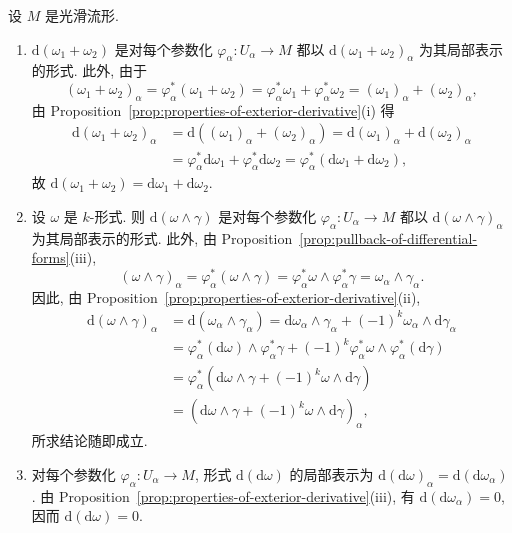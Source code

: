\begin{description}[font=\normalfont,leftmargin=2em,labelwidth=1.5em]
设 $M$ 是光滑流形.
\begin{enumerate}[label=(\roman*),ref=\roman*,leftmargin=*]
\item $\mathrm{d}(\omega_1+\omega_2)$ 是对每个参数化 $\varphi_\alpha:U_\alpha\to M$ 都以 $\mathrm{d}(\omega_1+\omega_2)_\alpha$ 为其局部表示的形式. 此外, 由于
\[
  (\omega_1+\omega_2)_\alpha=\varphi_\alpha^*(\omega_1+\omega_2)
  =\varphi_\alpha^*\omega_1+\varphi_\alpha^*\omega_2=(\omega_1)_\alpha+(\omega_2)_\alpha,
\]
由 Proposition~\ref{prop:properties-of-exterior-derivative}(i) 得
\begin{align*}
  \mathrm{d}(\omega_1+\omega_2)_\alpha
  &=\mathrm{d}((\omega_1)_\alpha+(\omega_2)_\alpha)
  =\mathrm{d}(\omega_1)_\alpha+\mathrm{d}(\omega_2)_\alpha\\
  &=\varphi_\alpha^*\mathrm{d}\omega_1+\varphi_\alpha^*\mathrm{d}\omega_2
  =\varphi_\alpha^*(\mathrm{d}\omega_1+\mathrm{d}\omega_2),
\end{align*}
故 $\mathrm{d}(\omega_1+\omega_2)=\mathrm{d}\omega_1+\mathrm{d}\omega_2$.
\item 设 $\omega$ 是 $k$-形式. 则 $\mathrm{d}(\omega\wedge\gamma)$ 是对每个参数化 $\varphi_\alpha:U_\alpha\to M$ 都以 $\mathrm{d}(\omega\wedge\gamma)_\alpha$ 为其局部表示的形式. 此外, 由 Proposition~\ref{prop:pullback-of-differential-forms}(iii),
\[
  (\omega\wedge\gamma)_\alpha
  =\varphi_\alpha^*(\omega\wedge\gamma)
  =\varphi_\alpha^*\omega\wedge\varphi_\alpha^*\gamma=\omega_\alpha\wedge\gamma_\alpha.
\]
因此, 由 Proposition~\ref{prop:properties-of-exterior-derivative}(ii),
\begin{align*}
  \mathrm{d}(\omega\wedge\gamma)_\alpha
  &=\mathrm{d}(\omega_\alpha\wedge\gamma_\alpha)
  =\mathrm{d}\omega_\alpha\wedge\gamma_\alpha+(-1)^k\omega_\alpha\wedge\mathrm{d}\gamma_\alpha\\
  &=\varphi_\alpha^*(\mathrm{d}\omega)\wedge\varphi_\alpha^*\gamma
  +(-1)^k\varphi_\alpha^*\omega\wedge\varphi_\alpha^*(\mathrm{d}\gamma)\\
  &=\varphi_\alpha^*(\mathrm{d}\omega\wedge\gamma+(-1)^k\omega\wedge\mathrm{d}\gamma)\\
  &=(\mathrm{d}\omega\wedge\gamma+(-1)^k\omega\wedge\mathrm{d}\gamma)_\alpha,
\end{align*}
所求结论随即成立.
\item 对每个参数化 $\varphi_\alpha:U_\alpha\to M$, 形式 $\mathrm{d}(\mathrm{d}\omega)$ 的局部表示为 $\mathrm{d}(\mathrm{d}\omega)_\alpha=\mathrm{d}(\mathrm{d}\omega_\alpha)$. 由 Proposition~\ref{prop:properties-of-exterior-derivative}(iii), 有 $\mathrm{d}(\mathrm{d}\omega_\alpha)=0$, 因而 $\mathrm{d}(\mathrm{d}\omega)=0$.

\end{enumerate}
\end{description}
